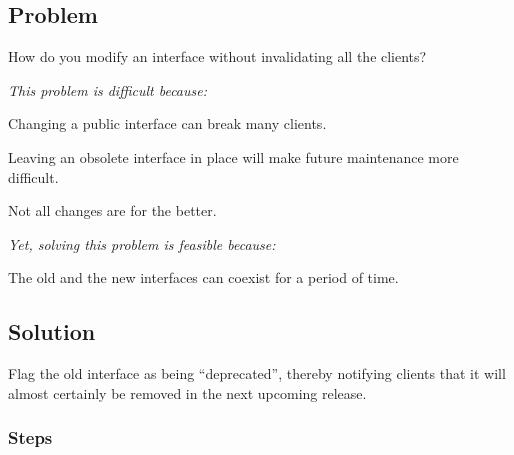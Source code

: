 \documentclass[a4paper,10pt,twoside]{book}
\begin{document}
\subsection*{Problem}

How do you modify an interface without invalidating all the clients?

\emph{This problem is difficult because:} 

\begin{bulletlist}
\item Changing a public interface can break many clients.

\item Leaving an obsolete interface in place will make future maintenance more difficult.

\item Not all changes are for the better.
\end{bulletlist}

\emph{Yet, solving this problem is feasible because:}

\begin{bulletlist}
\item The old and the new interfaces can coexist for a period of time.
\end{bulletlist}

\subsection*{Solution}

Flag the old interface as being ``deprecated'', thereby notifying clients that it will almost certainly be removed in the next upcoming release.

\subsubsection*{Steps}
\end{document}
